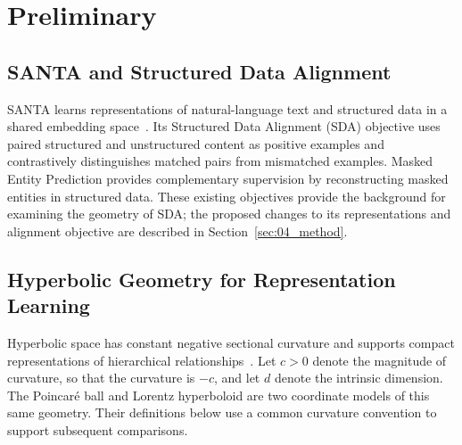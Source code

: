 \newpage

\section{Preliminary}
\label{sec:03_problem_formulation}

\subsection{SANTA and Structured Data Alignment}
SANTA learns representations of natural-language text and structured data in a shared embedding space~\cite{li2023structure}. Its Structured Data Alignment (SDA) objective uses paired structured and unstructured content as positive examples and contrastively distinguishes matched pairs from mismatched examples. Masked Entity Prediction provides complementary supervision by reconstructing masked entities in structured data. These existing objectives provide the background for examining the geometry of SDA; the proposed changes to its representations and alignment objective are described in Section~\ref{sec:04_method}.

\subsection{Hyperbolic Geometry for Representation Learning}
Hyperbolic space has constant negative sectional curvature and supports compact representations of hierarchical relationships~\cite{nickel2017poincare,nickel2018learning}. Let $c>0$ denote the magnitude of curvature, so that the curvature is $-c$, and let $d$ denote the intrinsic dimension. The Poincar\'e ball and Lorentz hyperboloid are two coordinate models of this same geometry. Their definitions below use a common curvature convention to support subsequent comparisons.

